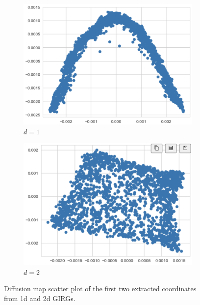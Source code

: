 \begin{figure}
    \centering

    \begin{subfigure}{0.45\textwidth}
      \centering
      \includegraphics[width=\linewidth]{figures/diffmap_1d_plot.png}
      \caption{$d=1$}
      \label{fig:sub1}
    \end{subfigure}
    \hfill
    \begin{subfigure}{0.45\textwidth}
      \centering
      \includegraphics[width=\linewidth]{figures/diffmap_2d_plot.png}
      \caption{$d=2$}
      \label{fig:cube_diffmap_plots_d2}
    \end{subfigure}

  
    \caption{Diffusion map scatter plot of the first two extracted coordinates from 1d and 2d GIRGs.}
    \label{fig:cube_diffmap_plots_d1and2}
\end{figure}


